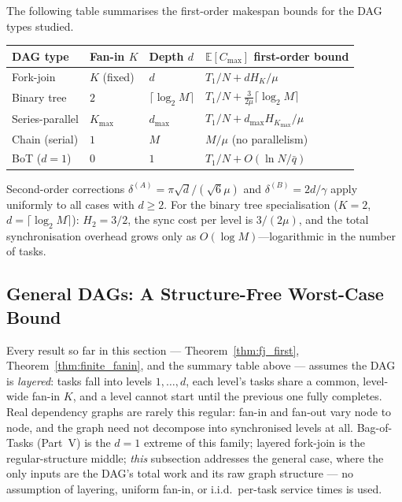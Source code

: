 \documentclass[11pt,a4paper]{report}
\begin{document}
The following table summarises the first-order makespan bounds for
the DAG types studied.

\begin{center}
\small
\begin{tabular}{@{}llll@{}}
\toprule
DAG type & Fan-in $K$ & Depth $d$ & $\mathbb{E}[C_{\max}]$ first-order bound \\
\midrule
Fork-join & $K$ (fixed) & $d$ & $T_1/N + d H_K/\mu$ \\
Binary tree & $2$ & $\lceil\log_2 M\rceil$ & $T_1/N + \tfrac{3}{2\mu}\lceil\log_2 M\rceil$ \\
Series-parallel & $K_{\max}$ & $d_{\max}$ & $T_1/N + d_{\max} H_{K_{\max}}/\mu$ \\
Chain (serial) & $1$ & $M$ & $M/\mu$ \quad (no parallelism) \\
BoT ($d=1$) & $0$ & $1$ & $T_1/N + O(\ln N/\bar{q})$ \\
\bottomrule
\end{tabular}
\end{center}

\noindent
Second-order corrections $\delta^{(A)} = \pi\sqrt{d}/(\sqrt{6}\mu)$ and
$\delta^{(B)} = 2d/\gamma$ apply uniformly to all cases with $d \geq 2$.
For the binary tree specialisation ($K=2$, $d = \lceil\log_2 M\rceil$):
$H_2 = 3/2$, the sync cost per level is $3/(2\mu)$, and the total
synchronisation overhead grows only as $O(\log M)$---logarithmic in the
number of tasks.

\subsection{General DAGs: A Structure-Free Worst-Case Bound}
\label{sec:general-dag}

Every result so far in this section --- Theorem~\ref{thm:fj_first},
Theorem~\ref{thm:finite_fanin}, and the summary table above --- assumes
the DAG is \emph{layered}: tasks fall into levels $1,\ldots,d$, each
level's tasks share a common, level-wide fan-in $K$, and a level cannot
start until the previous one fully completes. Real dependency graphs
are rarely this regular: fan-in and fan-out vary node to node, and
the graph need not decompose into synchronised levels at all. Bag-of-Tasks
(Part~V) is the $d=1$ extreme of this family; layered fork-join is the
regular-structure middle; \emph{this} subsection addresses the general
case, where the only inputs are the DAG's total work and its raw
graph structure --- no assumption of layering, uniform fan-in, or
i.i.d.\ per-task service times is used.
\end{document}
